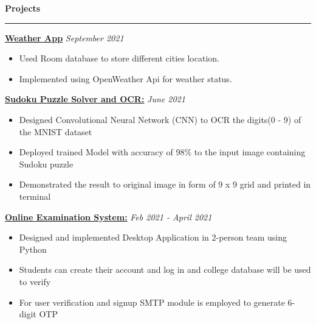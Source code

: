 \documentclass[11pt]{article}
\begin{document}
    \textbf{\large{Projects}}
    	\vspace{5pt}
    	\hrule
    	\vspace{4pt}
    	\hspace{8pt}
    	\href{https://github.com/Abhay811/Weather-App}{\textbf{Weather App}}
    	\hfill
        \textit{September 2021}
        \vspace{-6pt}
        \begin{itemize}
        	\setlength{\itemsep}{0pt}
        	\setlength{\parskip}{0pt}
        	\setlength{\parsep}{0pt}
        	\item Used Room database to store different cities location.
        	\item Implemented using OpenWeather Api for weather status.
        \end{itemize}
    	\hspace{8pt}
    	\href{https://github.com/Abhay811/Sudoku_solver}{\textbf{Sudoku Puzzle Solver and OCR:}}
    	\hfill
    	\textit{June 2021}
    	\vspace{-6pt}
       	\begin{itemize}
        	\setlength\itemsep{0pt}
        	\setlength\parskip{0pt}
        	\setlength\parsep{0pt}
        	\item  Designed Convolutional Neural Network (CNN) to OCR the digits(0 - 9) of the MNIST dataset
        	\item Deployed trained Model with accuracy of 98\% to the input image containing Sudoku puzzle
        	\item Demonstrated the result to original image in form of 9 x 9 grid and printed in terminal
        \end{itemize}
    	\hspace{8pt}\href{https://github.com/Abhay811/Advanced-Online-Examination}{\textbf{Online Examination System:}}
    	\hfill
    	\textit{Feb 2021 - April 2021}
    	\vspace{-6pt}
    	\begin{itemize}
        	\setlength{\itemsep}{0pt}
        	\setlength{\parskip}{0pt}
        	\setlength{\parsep}{0pt}
        	\item Designed and implemented Desktop Application in 2-person team using Python
        	\item Students can create their account and log in and college database will be used to verify
        	\item For user verification and signup SMTP module is employed to generate 6-digit OTP
    	\end{itemize}
\end{document}

